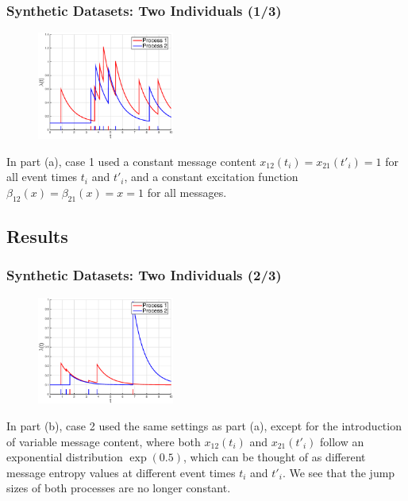 \documentclass{beamer}
\begin{document}
\begin{frame}
\frametitle{Synthetic Datasets: Two Individuals (1/3)}
\begin{figure}
  \centering  
	\includegraphics[width=0.4\textwidth]{figures/case1}
  \label{fi: example 1}
\end{figure}
In part (a), case 1 used a constant message content $x_{12}(t_i) = x_{21}(t'_i) = 1$ for all event times $t_i$ and $t'_i$, and a constant excitation function $\beta_{12}(x) = \beta_{21}(x) = x = 1$ for all messages.
\end{frame}

\subsection{Results}
\begin{frame}
\frametitle{Synthetic Datasets: Two Individuals (2/3)}
\begin{figure}
  \centering  
	\includegraphics[width=0.4\textwidth]{figures/case2}
  \label{fi: example 1}
\end{figure}
In part (b), case 2 used the same settings as part (a), except for the introduction of variable message content, where both $x_{12}(t_i)$ and $x_{21}(t'_i)$ follow an exponential distribution $\exp(0.5)$, which can be thought of as different message entropy values at different event times $t_i$ and $t'_i$. We see that the jump sizes of both processes are no longer constant.
\end{frame}
\end{document}
